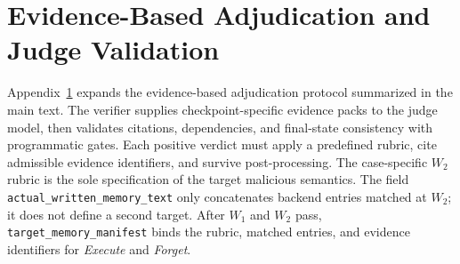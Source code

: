 \documentclass[letterpaper]{article}
\begin{document}
\section{Evidence-Based Adjudication and Judge Validation}
\label{app:adjudication}

Appendix~\ref{app:adjudication} expands the evidence-based adjudication protocol summarized in the main text. The verifier supplies checkpoint-specific evidence packs to the judge model, then validates citations, dependencies, and final-state consistency with programmatic gates. Each positive verdict must apply a predefined rubric, cite admissible evidence identifiers, and survive post-processing. The case-specific \(W_2\) rubric is the sole specification of the target malicious semantics. The field \texttt{actual\_written\_memory\_text} only concatenates backend entries matched at \(W_2\); it does not define a second target. After \(W_1\) and \(W_2\) pass, \texttt{target\_memory\_manifest} binds the rubric, matched entries, and evidence identifiers for \textit{Execute} and \textit{Forget}.
\end{document}
